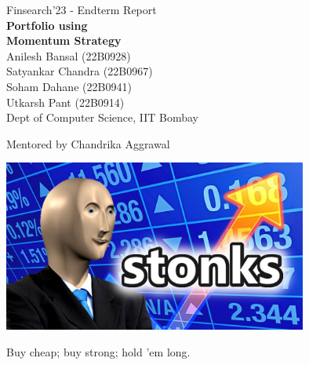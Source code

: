 \documentclass[a4paper]{article}
\begin{document}

\begin{titlepage}
    \vspace*{\fill}
    \begin{center}
        \Large Finsearch'23 - Endterm Report \\[0.5cm]
        \fontsize{40pt}{40pt}\selectfont\textbf{Portfolio using \\ Momentum Strategy} \\[1cm]
        {\Large Anilesh Bansal (22B0928) \\ Satyankar Chandra (22B0967) \\ Soham Dahane (22B0941) \\ Utkarsh Pant (22B0914)\\ Dept of Computer Science, IIT Bombay}\\
    \end{center}
    \vspace*{\fill}
    \begin{center}
        \Large Mentored by Chandrika Aggrawal
    \end{center}
\end{titlepage}

\thispagestyle{empty}

\clearpage

\begin{titlepage}
    \vspace*{\fill}
    \begin{center}
        \includegraphics[width = 10cm]{stonks.jpeg}
    \end{center}
    \vspace{40pt}
    \begin{center}
        \fontsize{25pt}{25pt}\selectfont Buy cheap; buy strong; hold 'em long.
    \end{center}
    \vspace*{\fill}
\end{titlepage}
\end{document}
